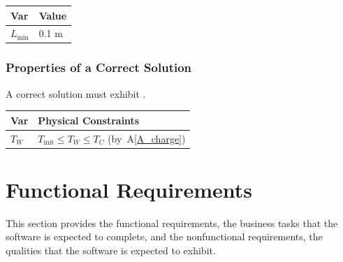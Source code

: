 \documentclass[12pt]{article}
\newcommand{\aref}[1]{A\ref{#1}}
\begin{document}
\begin{table}[!h]
\caption{Specification Parameter Values} \label{TblSpecParams}
\renewcommand{\arraystretch}{1.2}
\noindent \begin{longtable*}{l l} 
  \toprule
  \textbf{Var} & \textbf{Value} \\
  \midrule 
  $L_\text{min}$ & 0.1 \si{\metre}\\
  \bottomrule
\end{longtable*}
\end{table}

\subsubsection{Properties of a Correct Solution} \label{sec_CorrectSolution}

\noindent
A correct solution must exhibit .  

\begin{table}[!h]
\caption{Output Variables} \label{TblOutputVar}
\renewcommand{\arraystretch}{1.2}
\noindent \begin{longtable*}{l l} 
  \toprule
  \textbf{Var} & \textbf{Physical Constraints} \\
  \midrule 
  $T_W$ & $T_\text{init} \leq T_W \leq T_C$ (by~\aref{A_charge})
  \\
  \bottomrule
\end{longtable*}
\end{table}

\clearpage
\section{Functional Requirements}
This section provides the functional requirements, the business tasks that the
software is expected to complete, and the nonfunctional requirements, the
qualities that the software is expected to exhibit.
\end{document}
